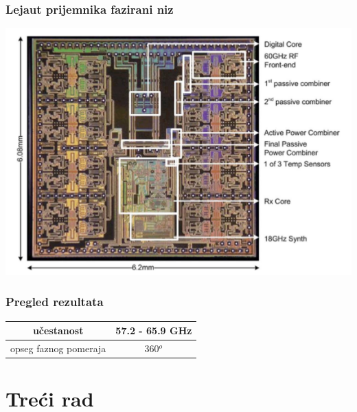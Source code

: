 \documentclass{beamer}
\begin{document}
\begin{frame}
\frametitle{Lejaut prijemnika fazirani niz}
  \includegraphics[width=\linewidth]{layout60GHz-IBM.png}
\end{frame}


\begin{frame}
\frametitle{Pregled rezultata}
\begin{center}
\begin{tabular}{ | c | c | }
  \hline
  učestanost & 57.2 - 65.9 GHz \\
  \hline 
  opseg faznog pomeraja & 360$^o$ \\  
  \hline
\end{tabular}
\end{center}
\end{frame}


\section{Treći rad}

\end{document}
